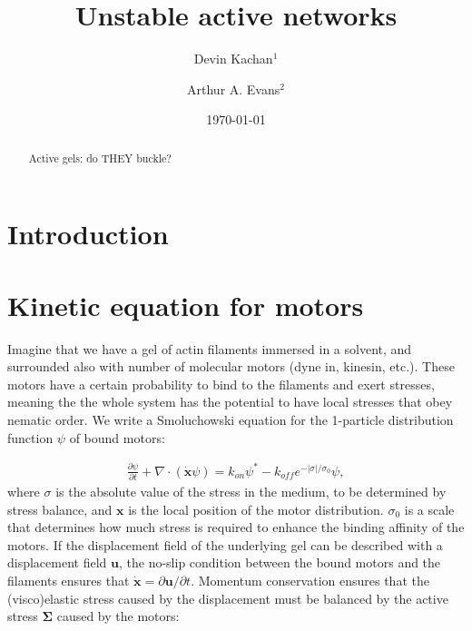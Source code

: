 \documentclass[onecolumn,showpacs,preprintnumbers,prl,amsmath,amssymb]{revtex4-1}
\def\b{\mathbf}
\begin{document}
\title{Unstable active networks}

\author{Devin Kachan$^1$}
\author{Arthur A. Evans$^2$}
 




\date{\today}

\begin{abstract}
Active gels: do THEY buckle?
\end{abstract}

\maketitle


\section{Introduction}

\section{Kinetic equation for motors}

Imagine that we have a gel of actin filaments immersed in a solvent, and surrounded also with number of molecular motors (dyne in, kinesin, etc.). These motors have a certain probability to bind to the filaments and exert stresses, meaning the the whole system has the potential to have local stresses that obey nematic order. We write a Smoluchowski equation for the 1-particle distribution function $\psi$ of bound motors:

\begin{gather}
\frac{\partial \psi}{\partial t}+\nabla\cdot(\dot{\b{x}}\psi)=k_{on}\psi^{*}-k_{off}e^{-|\sigma|/\sigma_0}\psi,
\end{gather}
where $\sigma$ is the absolute value of the stress in the medium, to be determined by stress balance, and $\b{x}$ is the local position of the motor distribution. $\sigma_0$ is a scale that determines how much stress is required to enhance the binding affinity of the motors.  If the displacement field of the underlying gel can be described with a displacement field $\b{u}$, the no-slip condition between the bound motors and the filaments ensures that $\dot{\b{x}}=\partial \b{u}/\partial t$. Momentum conservation ensures that the (visco)elastic stress caused by the displacement must be balanced by the active stress $\b{\Sigma}$ caused by the motors:
\end{document}
